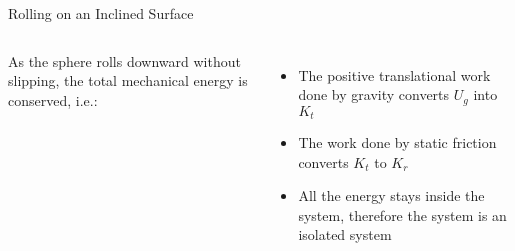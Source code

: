 \documentclass[12pt,compress,aspectratio=169]{beamer}
\begin{document}
\begin{frame}{Rolling on an Inclined Surface}
  \begin{columns}
    

    As the sphere rolls downward without slipping, the total mechanical
    energy is conserved, i.e.:

    \begin{itemize}
    \item\vspace{-.1in}The positive translational work done by gravity converts
      $U_g$ into $K_t$
    \item The work done by static friction converts $K_t$ to $K_r$
    \item All the energy stays inside the system, therefore the system is an
      isolated system
    \end{itemize}
  \end{columns}
\end{frame} 
\end{document}
